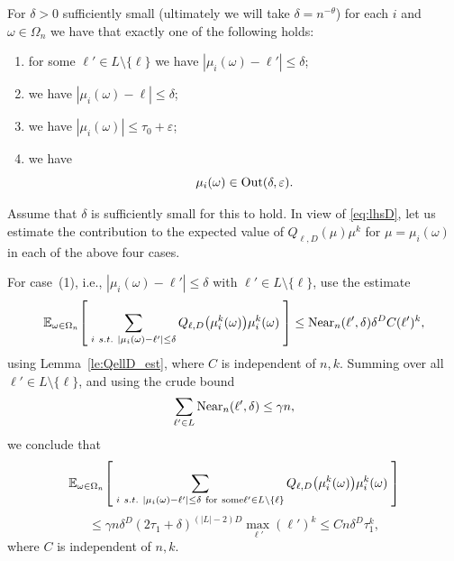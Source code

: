 \documentclass{memo-l}
\theoremstyle{plain}
\theoremstyle{definition}
\numberwithin{section}{chapter}
\numberwithin{equation}{chapter}
\newcommand{\expect}[2]{{\mathbb{E}}_{#1}{\left[\; #2\; \right]}}
\theoremstyle{plain}
\theoremstyle{definition}
\begin{document}
For \( \delta>0 \) sufficiently small (ultimately we will take \(
\delta=n^{-\theta} \)) for each \( i \) and \( \omega\in\Omega_n \) we have
that exactly one of the following holds: \begin{enumerate} \item for some
\( \ell'\in L\setminus\{\ell\} \) we have \( |\mu_i(\omega)-\ell'| \leq
\delta \); \item we have \( |\mu_i(\omega)-\ell|\leq \delta \); \item we
have \( |\mu_i(\omega)| \leq \tau_0+\varepsilon \); \item we have \[
\mu_i(\omega)\in {\rm Out}(\delta,\varepsilon).  \] \end{enumerate} Assume
that $\delta$ is sufficiently small for this to hold.  In view of
\eqref{eq:lhsD}, let us estimate the contribution to the expected value of
$Q_{\ell,D}(\mu)\mu^k$ for $\mu=\mu_i(\omega)$ in each of the above four
cases.

For case~(1), i.e., $|\mu_i(\omega)-\ell'|\le\delta$ with $\ell'\in
L\setminus\{\ell\}$, use the estimate \[ \expect{\omega\in\Omega_n}{
\sum_{i\ s.t.\ |\mu_i(\omega)-\ell'|\leq \delta}
Q_{\ell,D}\bigl(\mu_i^k(\omega)\bigr) \mu_i^k(\omega) } \leq {\rm
Near}_n(\ell',\delta) \delta^D C (\ell')^k, \] using
Lemma~\ref{le:QellD_est}, where $C$ is independent of $n,k$.  Summing over
all $\ell'\in L\setminus\{\ell\}$, and using the crude bound \[
\sum_{\ell'\in L} {\rm Near}_n(\ell',\delta) \leq \gamma n, \] we conclude
that \begin{equation}\label{eq:k_power_error1} \expect{\omega\in\Omega_n}{
\sum_{i\ s.t.\ |\mu_i(\omega)-\ell'|\leq \delta {\rm \ for\ some }\ell'\in
L\setminus\{\ell\}} Q_{\ell,D}\bigl(\mu_i^k(\omega)\bigr) \mu_i^k(\omega) }
\end{equation} \[ \leq \gamma  n \delta^D (2\tau_1+\delta)^{(|L|-2)D}
\max_{\ell'} (\ell')^k \leq C n\delta^D \tau_1^k, \] where $C$ is
independent of $n,k$.
\end{document}
